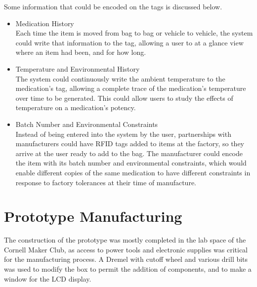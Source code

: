 \documentclass{sigchi}
\begin{document}
Some information that could be encoded on the tags is discussed below.

\begin{itemize}
\item Medication History\\
	Each time the item is moved from bag to bag or vehicle to vehicle,
    the system could write that information to the tag, allowing a user to
    at a glance view where an item had been, and for how long.

\item Temperature and Environmental History\\
	The system could continuously write the ambient temperature to the medication's
    tag, allowing a complete trace of the medication's temperature over time to be
    generated. This could allow users to study the effects of temperature on a
    medication's potency.

\item Batch Number and Environmental Constraints\\
	Instead of being entered into the system by the user, partnerships with
    manufacturers could have RFID tags added to items at the factory, so they arrive
    at the user ready to add to the bag. The manufacturer could encode the item with
    its batch number and environmental constraints, which would enable different
    copies of the same medication to have different constraints in response to
    factory tolerances at their time of manufacture.
\end{itemize}


\section{Prototype Manufacturing} \label{manufacturing}
The construction of the prototype was mostly completed in the lab space of the
Cornell Maker Club, as access to power tools and electronic supplies was critical
for the manufacturing process. A Dremel with cutoff wheel and various drill bits
was used to modify the box to permit the addition of components, and to make a
window for the LCD display.
\end{document}
